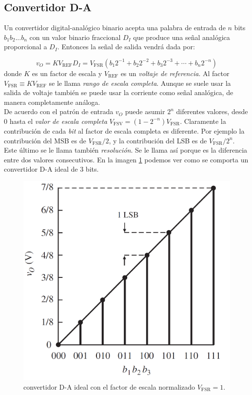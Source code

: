 \documentclass[11pt]{article} %
\newcommand{\REF}{\mathrm{REF}}
\newcommand{\FSR}{\mathrm{FSR}}
\newcommand{\FSV}{\mathrm{FSV}}
\begin{document}
\subsection{Convertidor D-A}

Un convertidor digital-analógico binario acepta una palabra de entrada de $n$ bits $b_1 b_2...b_n$ con un valor binario fraccional $D_I$ que produce una señal analógica proporcional a $D_I$. Entonces la señal de salida vendrá dada por:

\begin{equation}
v_O = K V_{\mathrm{REF}} D_I = V_\FSR (b_1 2^{-1} + b_2 2^{-2} + b_3 2^{-3} + \cdots + b_n 2^{-n})
\end{equation}
donde $K$ es un factor de escala y $V_\REF$ es un \textit{voltaje de referencia}. Al factor $V_\FSR \equiv K V_\REF$ se le llama \textit{rango de escala completa}. Aunque se suele usar la salida de voltaje también se puede usar la corriente como señal analógica, de manera completamente análoga. \\

De acuerdo con el patrón de entrada $v_O$ puede asumir $2^n$ diferentes valores, desde 0 hasta el \textit{valor de escala completa} $V_\FSV = (1-2^{-n}) V_\FSR$. Claramente la contribución de cada \textit{bit} al factor de escala completa es diferente. Por ejemplo la contribución del MSB es de $V_\FSR /2$, y la contribución del LSB es de $V_\FSR / 2^{n}$. Este último se le llama también \textit{resolución}. Se le llama así porque es la diferencia entre dos valores consecutivos.  En la imagen \ref{Fig:3.01} podemos ver como se comporta un convertidor D-A ideal de 3 bits.   \\

\begin{figure}[h!] \centering
\includegraphics[scale=0.35]{3.1-Ideal.png}
\caption{convertidor D-A ideal con el factor de escala normalizado $V_\FSR = 1$.}
\label{Fig:3.01}
\end{figure} 
\end{document}
